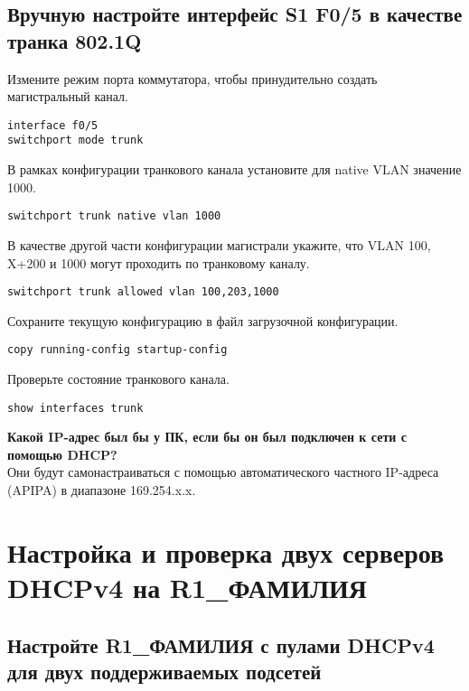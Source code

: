 \subsection{Вручную настройте интерфейс S1 F0/5 в качестве транка 802.1Q}

Измените режим порта коммутатора,
чтобы принудительно создать магистральный канал.

\begin{verbatim}
interface f0/5
switchport mode trunk
\end{verbatim}

В рамках конфигурации транкового канала установите
для native VLAN значение 1000.

\begin{verbatim}
switchport trunk native vlan 1000
\end{verbatim}

В качестве другой части конфигурации магистрали укажите, что VLAN 100, X+200 и 1000 могут проходить по транковому каналу.

\begin{verbatim}
switchport trunk allowed vlan 100,203,1000
\end{verbatim}

Сохраните текущую конфигурацию в файл загрузочной конфигурации.

\begin{verbatim}
copy running-config startup-config
\end{verbatim}

Проверьте состояние транкового канала.

\begin{verbatim}
show interfaces trunk
\end{verbatim}

\textbf{Какой IP-адрес был бы у ПК,
если бы он был подключен к сети с помощью DHCP?}\\
Они будут самонастраиваться с помощью автоматического
частного IP-адреса (APIPA) в диапазоне 169.254.x.x.


\section{Настройка и проверка двух серверов DHCPv4 на R1\_ФАМИЛИЯ}

\subsection{Настройте R1\_ФАМИЛИЯ с пулами DHCPv4
	для двух поддерживаемых подсетей}

